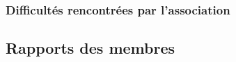 \documentclass[12pt]{report}
\begin{document}
    \subsection{Difficultés rencontrées par l'association}
  \begin{appendices}
    \chapter{Rapports des membres}
    
    
    
    
  \end{appendices}
\end{document}
